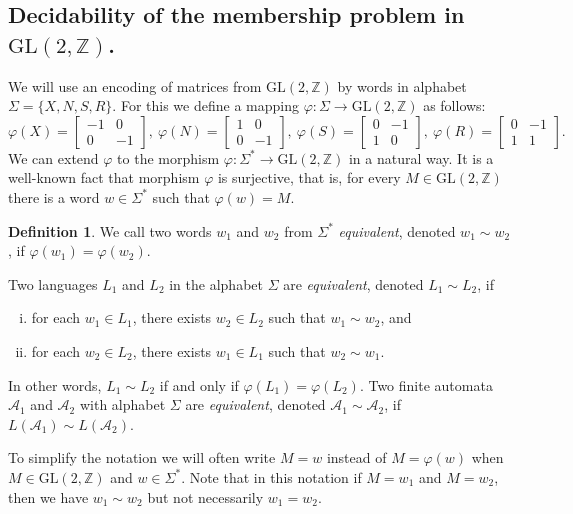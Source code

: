 \documentclass[fontsize=11pt,DIV=13,paper=letter]{scrartcl}
\theoremstyle{definition}
\newtheorem{definition}[theorem]{Definition}
\newcommand{\A}{\mathcal{A}}
\newcommand{\Z}{\mathbb{Z}}
\newcommand{\GL}{\mathrm{GL}(2,\Z)}
\renewcommand{\phi}{\varphi}
\begin{document}
\subsection{Decidability of the membership problem in $\GL$.}\label{GL}

We will use an encoding of matrices from $\GL$ by words in alphabet $\Sigma=\{X,N,S,R\}$. For this we define a mapping $\phi: \Sigma\to \GL$ as follows:
\[
\phi(X)=\begin{bmatrix} -1 & 0\\ 0 & -1\end{bmatrix}\!,\
\phi(N)=\begin{bmatrix} 1 & 0\\ 0 & -1\end{bmatrix}\!,\
\phi(S)=\begin{bmatrix} 0 & -1\\ 1 & 0\end{bmatrix}\!,\
\phi(R)=\begin{bmatrix} 0 & -1\\ 1 & 1\end{bmatrix}\!.
\]
We can extend $\phi$ to the morphism $\phi: \Sigma^* \to \GL$ in a natural way. It is a well-known fact that morphism $\phi$ is surjective, that is, for every $M\in \GL$ there is a word $w\in \Sigma^*$ such that $\phi(w)=M$.

\begin{definition}
We call two words $w_1$ and $w_2$ from $\Sigma^*$ \emph{equivalent}, denoted $w_1\sim w_2$, if $\phi(w_1)=\phi(w_2)$.

Two languages $L_1$ and $L_2$ in the alphabet $\Sigma$ are \emph{equivalent}, denoted $L_1\sim L_2$, if
\begin{enumerate}[(i)]
\item for each $w_1\in L_1$, there exists $w_2\in L_2$ such that $w_1\sim w_2$, and
\item for each $w_2\in L_2$, there exists $w_1\in L_1$ such that $w_2\sim w_1$.
\end{enumerate}
In other words, $L_1\sim L_2$ if and only if $\phi(L_1)=\phi(L_2)$.
Two finite automata $\A_1$ and $\A_2$ with alphabet $\Sigma$ are \emph{equivalent}, denoted $\A_1\sim \A_2$, if $L(\A_1)\sim L(\A_2)$.
\end{definition}

To simplify the notation we will often write $M=w$ instead of $M=\phi(w)$ when $M\in \GL$ and $w\in \Sigma^*$. Note that in this notation if $M=w_1$ and $M=w_2$, then we have $w_1\sim w_2$ but not necessarily $w_1=w_2$.
\end{document}
